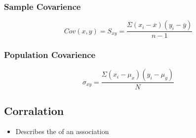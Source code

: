 \documentclass{article}
\begin{document}
\subsubsection{Sample Covarience}
\[ Cov(x,y) = S_{xy} = \frac{\Sigma(x_i - \overline{x})(y_i - \overline{y})}{n-1} \]

\subsubsection{Population Covarience}
\[ \sigma_{xy} = \frac{\Sigma(x_i - \mu_x)(y_i - \mu_y)}{N} \]

\subsection{Corralation}
\begin{itemize}
  \item Describes the {\color{red}{magnitude}} of an association
\end{itemize}

\end{document}
